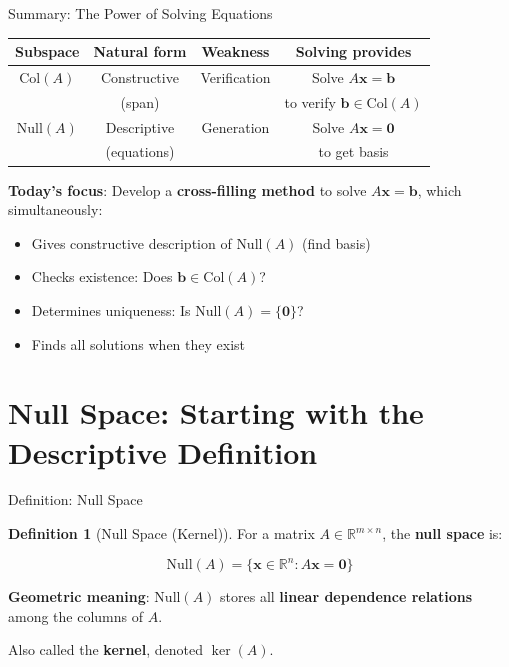 \documentclass[10pt]{beamer}
\theoremstyle{definition}
\newtheorem{defi}{Definition}[section]
\newcommand{\x}[1]{\alert{\textbf{#1}}}
\begin{document}
\begin{frame}{Summary: The Power of Solving Equations}

\begin{center}
\begin{tabular}{|c|c|c|c|}
\hline
\textbf{Subspace} & \textbf{Natural form} & \textbf{Weakness} & \textbf{Solving provides} \\
\hline
$\text{Col}(A)$ & Constructive & Verification & Solve $A\mathbf{x}=\mathbf{b}$ \\
 & (span) &  & to verify $\mathbf{b} \in \text{Col}(A)$ \\
\hline
$\text{Null}(A)$ & Descriptive & Generation & Solve $A\mathbf{x}=\mathbf{0}$ \\
 & (equations) &  & to get basis \\
\hline
\end{tabular}
\end{center}

\vspace{1em}

\x{Today's focus}: Develop a \textbf{cross-filling method} to solve $A\mathbf{x} = \mathbf{b}$, which simultaneously:

\begin{itemize}
\item Gives constructive description of $\text{Null}(A)$ (find basis)
\item Checks existence: Does $\mathbf{b} \in \text{Col}(A)$?
\item Determines uniqueness: Is $\text{Null}(A) = \{\mathbf{0}\}$?
\item Finds all solutions when they exist
\end{itemize}

\end{frame}

\section{Null Space: Starting with the Descriptive Definition}

\begin{frame}{Definition: Null Space}

\begin{defi}[Null Space (Kernel)]
For a matrix $A \in \mathbb{R}^{m \times n}$, the \x{null space} is:

$$\text{Null}(A) = \{\mathbf{x} \in \mathbb{R}^n : A\mathbf{x} = \mathbf{0}\}$$

\textbf{Geometric meaning}: $\text{Null}(A)$ stores all \x{linear dependence relations} among the columns of $A$.

Also called the \x{kernel}, denoted $\ker(A)$.
\end{defi}

\end{frame}
\end{document}
